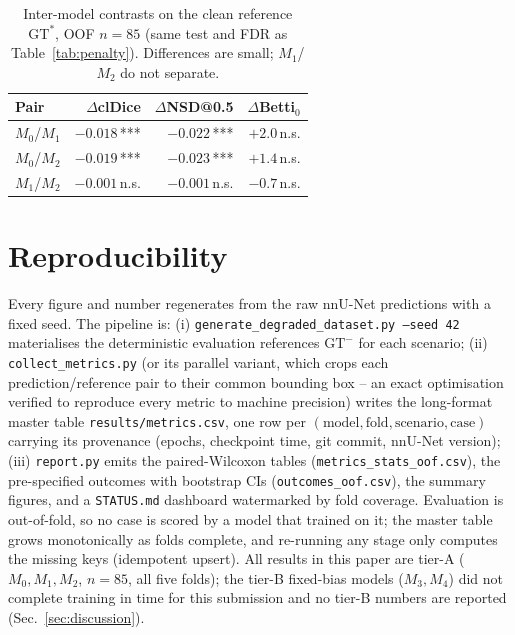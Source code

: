 \documentclass[
    bookmarks, bookmarksnumbered, bookmarksopen,
    colorlinks=true, citecolor=blue, linkcolor=blue, urlcolor=blue
]{techrep}
\newcommand{\gtstar}{\ensuremath{\mathrm{GT}^{\!*}}}
\newcommand{\gtminus}{\ensuremath{\mathrm{GT}^{\!-}}}
\begin{document}
\begin{table}[htb]
  \centering
  \caption{Inter-model contrasts on the clean reference $\gtstar$, OOF $n{=}85$ (same test and
  FDR as Table~\ref{tab:penalty}). Differences are small; $M_1$/$M_2$ do not separate.}
  \label{tab:intermodel}
  \small
  \begin{tabular}{lrrr}
    \toprule
    Pair & $\Delta$clDice & $\Delta$NSD@0.5 & $\Delta$Betti$_0$ \\
    \midrule
    $M_0$/$M_1$ & $-0.018$\,*** & $-0.022$\,*** & $+2.0$\,n.s. \\
    $M_0$/$M_2$ & $-0.019$\,*** & $-0.023$\,*** & $+1.4$\,n.s. \\
    $M_1$/$M_2$ & $-0.001$\,n.s. & $-0.001$\,n.s. & $-0.7$\,n.s. \\
    \bottomrule
  \end{tabular}
\end{table}

\chapter{Reproducibility}\label{app:repro}
Every figure and number regenerates from the raw nnU-Net predictions with a fixed seed.
The pipeline is: (i) \texttt{generate\_degraded\_dataset.py --seed 42} materialises the
deterministic evaluation references $\gtminus$ for each scenario; (ii)
\texttt{collect\_metrics.py} (or its parallel variant, which crops each prediction/reference
pair to their common bounding box -- an exact optimisation verified to reproduce every metric to
machine precision) writes the long-format master table \texttt{results/metrics.csv}, one row per
$(\text{model},\text{fold},\text{scenario},\text{case})$ carrying its provenance (epochs,
checkpoint time, git commit, nnU-Net version); (iii) \texttt{report.py} emits the paired-Wilcoxon
tables (\texttt{metrics\_stats\_oof.csv}), the pre-specified outcomes with bootstrap CIs
(\texttt{outcomes\_oof.csv}), the summary figures, and a \texttt{STATUS.md} dashboard watermarked
by fold coverage. Evaluation is out-of-fold, so no case is scored by a model that trained on it;
the master table grows monotonically as folds complete, and re-running any stage only computes
the missing keys (idempotent upsert). All results in this paper are tier-A ($M_0,M_1,M_2$,
$n{=}85$, all five folds); the tier-B fixed-bias models ($M_3,M_4$) did not complete training
in time for this submission and no tier-B numbers are reported (Sec.~\ref{sec:discussion}).
\end{document}
